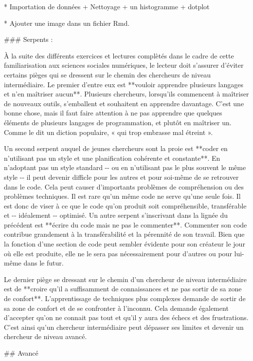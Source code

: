 \documentclass[
  letterpaper,
]{scrbook}
\begin{document}
* Importation de données + Nettoyage + un histogramme + dotplot

* Ajouter une image dans un fichier Rmd.

\#\#\# Serpents :

À la suite des différents exercices et lectures complètés dans le cadre
de cette familiarisation aux sciences sociales numériques, le lecteur
doit s'assurer d'éviter certains pièges qui se dressent sur le chemin
des chercheurs de niveau intermédiaire. Le premier d'entre eux est
**vouloir apprendre plusieurs langages et n'en maîtriser aucun**.
Plusieurs chercheurs, lorsqu'ils commencent à maîtriser de nouveaux
outils, s'emballent et souhaitent en apprendre davantage. C'est une
bonne chose, mais il faut faire attention à ne pas apprendre que
quelques éléments de plusieurs langages de programmation, et plutôt en
maîtriser un. Comme le dit un diction populaire, « qui trop embrasse mal
étreint ».

Un second serpent auquel de jeunes chercheurs sont la proie est **coder
en n'utilisant pas un style et une planification cohérente et
constante**. En n'adoptant pas un style standard -\/- ou en n'utilisant
pas le plus souvent le même style -\/- il peut devenir difficle pour les
autres et pour soi-même de se retrouver dans le code. Cela peut causer
d'importants problèmes de compréhension ou des problèmes techniques. Il
est rare qu'un même code ne serve qu'une seule fois. Il est donc de
viser à ce que le code qu'on produit soit compréhensible, transférable
et -\/- idéalement -\/- optimisé. Un autre serpent s'inscrivant dans la
lignée du précédent est **écrire du code mais ne pas le commenter**.
Commenter son code contribue grandement à la transférabilité et la
pérennité de son travail. Bien que la fonction d'une section de code
peut sembler évidente pour son créateur le jour où elle est produite,
elle ne le sera pas nécessairement pour d'autres ou pour lui-même dans
le futur.

Le dernier piège se dressant sur le chemin d'un chercheur de niveau
intermédiaire est de **croire qu'il a suffisamment de connaissances et
ne pas sortir de sa zone de confort**. L'apprentissage de techniques
plus complexes demande de sortir de sa zone de confort et de se
confronter à l'inconnu. Cela demande également d'accepter qu'on ne
connait pas tout et qu'il y aura des échecs et des frustrations. C'est
ainsi qu'un chercheur intermédiaire peut dépasser ses limites et devenir
un chercheur de niveau avancé.

\#\# Avancé
\end{document}
